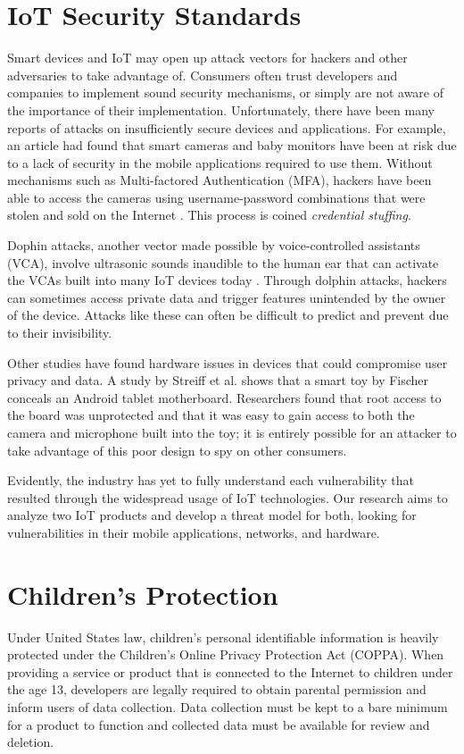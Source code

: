 \documentclass[12pt]{ucthesis}
\begin{document}
\section{IoT Security Standards}
Smart devices and IoT may open up attack vectors for hackers and other adversaries to take advantage of. Consumers often trust developers and companies to implement sound security mechanisms, or simply are not aware of the importance of their implementation. Unfortunately, there have been many reports of attacks on insufficiently secure devices and applications. For example, an article had found that smart cameras and baby monitors have been at risk due to a lack of security in the mobile applications required to use them. Without mechanisms such as Multi-factored Authentication (MFA), hackers have been able to access the cameras using username-password combinations that were stolen and sold on the Internet \cite{wp:camera}. This process is coined \textit{credential stuffing}.

Dophin attacks, another vector made possible by voice-controlled assistants (VCA), involve ultrasonic sounds inaudible to the human ear that can activate the VCAs built into many IoT devices today \cite{dolphin}. Through dolphin attacks, hackers can sometimes access private data and trigger features unintended by the owner of the device. Attacks like these can often be difficult to predict and prevent due to their invisibility.

Other studies have found hardware issues in devices that could compromise user privacy and data. A study by Streiff et al. \cite{streiff:overpowered} shows that a smart toy by Fischer conceals an Android tablet motherboard. Researchers found that root access to the board was unprotected and that it was easy to gain access to both the camera and microphone built into the toy; it is entirely possible for an attacker to take advantage of this poor design to spy on other consumers.

Evidently, the industry has yet to fully understand each vulnerability that resulted through the widespread usage of IoT technologies. Our research aims to analyze two IoT products and develop a threat model for both, looking for vulnerabilities in their mobile applications, networks, and hardware.

\section{Children's Protection}
Under United States law, children's personal identifiable information is heavily protected under the Children's Online Privacy Protection Act (COPPA). When providing a service or product that is connected to the Internet to children under the age 13, developers are legally required to obtain parental permission and inform users of data collection. Data collection must be kept to a bare minimum for a product to function and collected data must be available for review and deletion.
\end{document}
